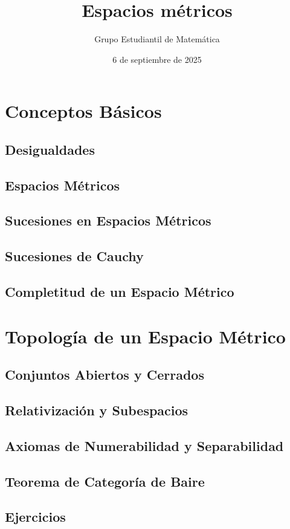 \documentclass{book}
\title{Espacios métricos}
\author{Grupo Estudiantil de Matemática}
\date{6 de septiembre de 2025}
\begin{document}
\maketitle
\tableofcontents

\chapter{Conceptos Básicos}
\section{Desigualdades}
\section{Espacios Métricos}
\section{Sucesiones en Espacios Métricos}
\section{Sucesiones de Cauchy}
\section{Completitud de un Espacio Métrico}
\chapter{Topología de un Espacio Métrico}
\section{Conjuntos Abiertos y Cerrados}
\section{Relativización y Subespacios}
\section{Axiomas de Numerabilidad y Separabilidad}
\section{Teorema de Categoría de Baire}
\section{Ejercicios}
\end{document}
